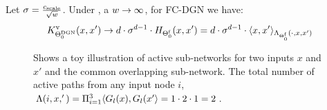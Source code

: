 \begin{theorem}\label{th:main} Let $\sigma=\frac{c_{\text{scale}}}{\sqrt{w}}$. Under , a $w\rightarrow\infty$, for FC-DGN we have: 
\begin{align*}
K^{\text{v}}_{\Theta^{\text{DGN}}_0}(x,x') &\rightarrow d\cdot \sigma^{d-1}\cdot H_{\Theta^{\textrm{f}}_0}(x,x')= d\cdot \sigma^{d-1}\cdot \langle x,x'\rangle_{\Lambda_{\Theta^{\textrm{f}}_0}(\cdot,x,x')}  \\
\end{align*}
\end{theorem}
\begin{figure}[h]
\begin{minipage}{0.49\columnwidth}
\end{minipage}
\begin{minipage}{0.49\columnwidth}
\end{minipage}
\caption{Shows a toy illustration of active sub-networks for two inputs $x$ and $x'$ and the common overlapping sub-network. The total number of active paths from any input node $i$, $\Lambda(i,x,')=\Pi_{i=1}^{3} \langle G_l(x),G_l(x'\rangle=1\cdot 2\cdot 1 =2$.}
\label{fig:overlap}
\end{figure}

